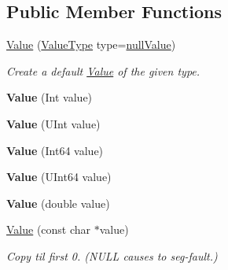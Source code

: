 \subsection*{Public Member Functions}
\begin{DoxyCompactItemize}
\item 
\hyperlink{class_json_1_1_value_ada6ba1369448fb0240bccc36efaa46f7}{Value} (\hyperlink{namespace_json_a7d654b75c16a57007925868e38212b4e}{Value\+Type} type=\hyperlink{namespace_json_a7d654b75c16a57007925868e38212b4ea7d9899633b4409bd3fc107e6737f8391}{null\+Value})
\begin{DoxyCompactList}\small\item\em Create a default \hyperlink{class_json_1_1_value}{Value} of the given type. \end{DoxyCompactList}\item 
\mbox{\label{class_json_1_1_value_a4744ae571fcf34f4b16a2257b3b3b585}} 
{\bfseries Value} (Int value)
\item 
\mbox{\label{class_json_1_1_value_ae67a857b01286e3499a87e95be848d20}} 
{\bfseries Value} (U\+Int value)
\item 
\mbox{\label{class_json_1_1_value_ab1cdc3d9a4d4cc03fa01439d43ceb1b5}} 
{\bfseries Value} (Int64 value)
\item 
\mbox{\label{class_json_1_1_value_a8adda58d5ae17bf7ca6a53bab4a7b69c}} 
{\bfseries Value} (U\+Int64 value)
\item 
\mbox{\label{class_json_1_1_value_a32228cc84d83200cca8441451997996c}} 
{\bfseries Value} (double value)
\item 
\mbox{\label{class_json_1_1_value_ad87b849356816aca75995dd07302e49d}} 
\hyperlink{class_json_1_1_value_ad87b849356816aca75995dd07302e49d}{Value} (const char $\ast$value)
\begin{DoxyCompactList}\small\item\em Copy til first 0. (N\+U\+LL causes to seg-\/fault.) \end{DoxyCompactList}\item 
\mbox{\label{class_json_1_1_value_a39fa09d1902efbd4350e1236db920571}} 

\end{DoxyCompactItemize}
